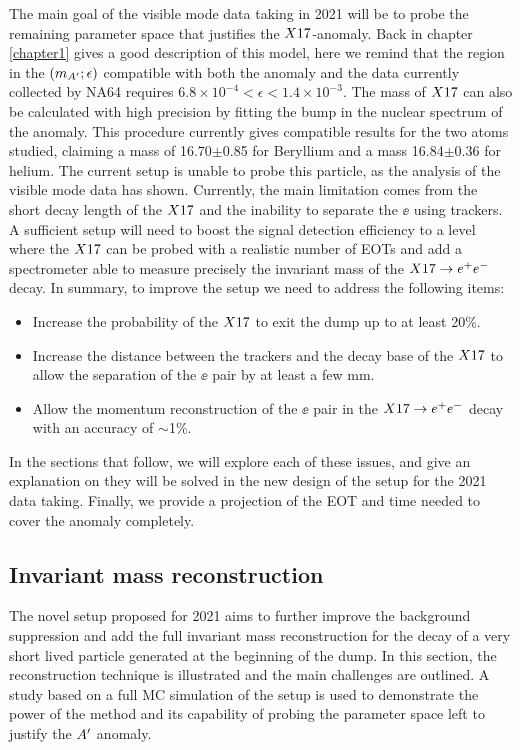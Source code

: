 The main goal of the visible mode data taking in 2021 will be to probe the remaining parameter space that justifies the $X17$-anomaly. Back in chapter \ref{chapter1} gives a good description of this model, here we remind that the region in the $(m_{A'};\epsilon)$ compatible with both the anomaly and the data currently collected by NA64 requires $6.8 \times 10^{-4} < \epsilon < 1.4 \times 10^{-3}$. The mass of $X17$ can also be calculated with high precision by fitting the bump in the nuclear spectrum of the anomaly. This procedure currently gives compatible results for the two atoms studied, claiming a mass of 16.70$\pm$0.85 \mev for Beryllium and a mass 16.84$\pm$0.36 \mev for helium. The current setup is unable to probe this particle, as the analysis of the visible mode data has shown. Currently, the main limitation comes from the short decay length of the $X17$ and the inability to separate the $\ee$ using trackers. A sufficient setup will need to boost the signal detection efficiency to a level where the $X17$ can be probed with a realistic number of EOTs and add a spectrometer able to measure precisely the invariant mass of the $X17 \rightarrow e^+ e^-$ decay. In summary, to improve the setup we need to address the following items:

\begin{itemize}
\item Increase the probability of the $X17$ to exit the dump up to at least 20\%.
\item Increase the distance between the trackers and the decay base of the $X17$ to allow the separation of the $\ee$ pair by at least a few mm.
\item Allow the momentum reconstruction of the $\ee$ pair in the $X17 \rightarrow e^+ e^-$ decay with an accuracy of $\sim$1\%.
\end{itemize}

In the sections that follow, we will explore each of these issues, and give an explanation on they will be solved in the new design of the setup for the 2021 data taking.  Finally, we provide a projection of the EOT and time needed to cover the anomaly completely.

\subsection{Invariant mass reconstruction}
\label{ch5:sec:new-vismode-setup-invmass}

The novel setup proposed for 2021 aims to further improve the background suppression and add the full invariant mass reconstruction for the decay of a very short lived particle generated at the beginning of the dump. In this section, the reconstruction technique is illustrated and the main challenges are outlined. A study based on a full MC simulation of the setup is used to demonstrate the power of the method and its capability of probing the parameter space left to justify the $A'$ anomaly.

